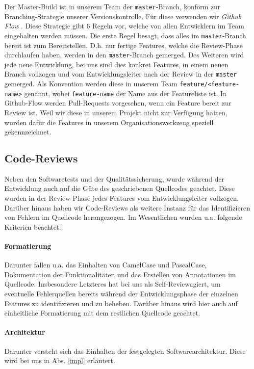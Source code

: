 \documentclass[12pt,a4paper]{scrartcl}
\newcommand{\code}[1]{\texttt{#1}}
\newcommand{\italic}[1]{\textit{#1}}
\begin{document}
Der Master-Build ist in unserem Team der \code{master}-Branch, konform zur Branching-Strategie unserer Versionskontrolle.
Für diese verwenden wir \italic{Github Flow} \cite{github-flow}.
Diese Strategie gibt 6 Regeln vor, welche von allen Entwicklern im Team eingehalten werden müssen.
Die erste Regel besagt, dass alles im \code{master}-Branch bereit ist zum Bereitstellen.
D.h. nur fertige Features, welche die Review-Phase durchlaufen haben, werden in den \code{master}-Branch gemerged.
Des Weiteren wird jede neue Entwicklung, bei uns sind dies konkret Features, in einem neuen Branch vollzogen und vom Entwicklungsleiter nach der Review in der \code{master} gemerged.
Als Konvention werden diese in unserem Team \code{feature/<feature-name>} genannt, wobei \code{feature-name} der Name aus der Featureliste ist.
In Github-Flow werden Pull-Requests vorgesehen, wenn ein Feature bereit zur Review ist.
Weil wir diese in unserem Projekt nicht zur Verfügung hatten, wurden dafür die Features in unserem Organisationswerkzeug speziell gekennzeichnet.

\subsection{Code-Reviews}
Neben den Softwaretests und der Qualitätssicherung, wurde während der Entwicklung auch auf die Güte des geschriebenen Quellcodes geachtet.
Diese wurden in der Review-Phase jedes Features vom Entwicklungsleiter vollzogen.
Darüber hinaus haben wir Code-Reviews als weitere Instanz für das Identifizieren von Fehlern im Quellcode herangezogen.
Im Wesentlichen wurden u.a. folgende Kriterien beachtet:

\paragraph{Formatierung}
Darunter fallen u.a. das Einhalten von CamelCase und PascalCase, Dokumentation der Funktionalitäten und das Erstellen von Annotationen im Quellcode.
Insbesondere Letzteres hat bei uns als \glqq Self-Review\grqq  agiert, um eventuelle Fehlerquellen bereits während der Entwicklungsphase der einzelnen Features zu identifizieren und zu beheben.
Darüber hinaus wird hier auch auf einheitliche Formatierung mit dem restlichen Quellcode geachtet.

\paragraph{Architektur}
Darunter versteht sich das Einhalten der festgelegten Softwarearchitektur.
Diese wird bei uns in Abs. \ref{impl} erläutert.
\end{document}
